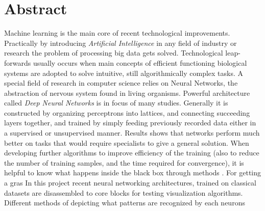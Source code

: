 \chapter*{Abstract}

Machine learning is the main core of recent technological improvements. Practically by introducing \emph{Artificial Intelligence} in any field of industry or research the problem of processing big data gets solved. Technological leap-forwards usually occurs when main concepts of efficient functioning biological systems are adopted to solve intuitive, still algorithmically complex tasks. A special field of research in computer science relies on Neural Networks, the abstraction of nervous system found in living organisms. Powerful architecture called \emph{Deep Neural Networks} is in focus of many studies. Generally it is constructed by organizing perceptrons into lattices, and connecting succeeding layers together, and trained by simply feeding previously recorded data either in a supervised or unsupervised manner. Results shows that networks perform much better on tasks that would require specialists to give a general solution. When developing further algorithms to improve efficiency of the training (also to reduce the number of training samples, and the time required for convergence), it is helpful to know what happens inside the black box through methods . For getting a gras
In this project recent neural networking architectures, 
trained on classical datasets are disassembled to core blocks for testing visualization algorithms.
Different methods of depicting what patterns are recognized by each neurons 
